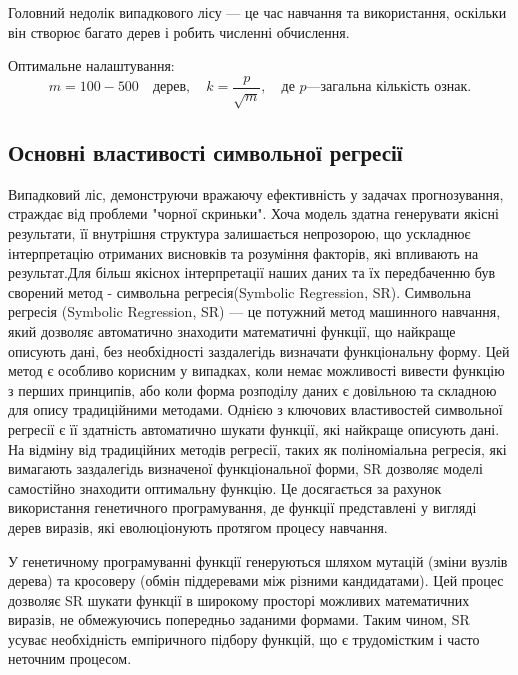 \documentclass[14pt,a4paper,titlepage,oneside]{book}
\numberwithin{equation}{part}
\begin{document}
Головний недолік випадкового лісу — це час навчання та використання, оскільки він створює багато дерев і робить численні обчислення.\cite{ml_sr_comp}



Оптимальне налаштування:
\[
m = 100 - 500 \quad \text{дерев}, \quad k = \frac{p}{\sqrt{m}}, \quad \text{де } p — \text{загальна кількість ознак.}
\]
\subsection{Основні властивості символьної регресії  }
Випадковий ліс, демонструючи вражаючу ефективність у задачах прогнозування, страждає від проблеми "чорної скриньки".  Хоча модель здатна генерувати якісні результати,  її внутрішня структура залишається непрозорою, що ускладнює  інтерпретацію отриманих висновків та  розуміння  факторів,  які  впливають на  результат.Для більш якіснох інтерпретації наших даних та їх передбаченню був сворений метод - символьна регресія(Symbolic Regression, SR).
Символьна регресія (Symbolic Regression, SR) — це потужний метод машинного навчання, який дозволяє автоматично знаходити математичні функції, що найкраще описують дані, без необхідності заздалегідь визначати функціональну форму.\cite{pysr
} Цей метод є особливо корисним у випадках, коли немає можливості вивести функцію з перших принципів, або коли форма розподілу даних є довільною та складною для опису традиційними методами. 
Однією з ключових властивостей символьної регресії є її здатність автоматично шукати функції, які найкраще описують дані.\cite{pysr} На відміну від традиційних методів регресії, таких як поліноміальна регресія, які вимагають заздалегідь визначеної функціональної форми, SR дозволяє моделі самостійно знаходити оптимальну функцію. Це досягається за рахунок використання генетичного програмування, де функції представлені у вигляді дерев виразів, які еволюціонують протягом процесу навчання.

У генетичному програмуванні функції генеруються шляхом мутацій (зміни вузлів дерева) та кросоверу (обмін піддеревами між різними кандидатами). Цей процес дозволяє SR шукати функції в широкому просторі можливих математичних виразів, не обмежуючись попередньо заданими формами. Таким чином, SR усуває необхідність емпіричного підбору функцій, що є трудомістким і часто неточним процесом.
\end{document}
